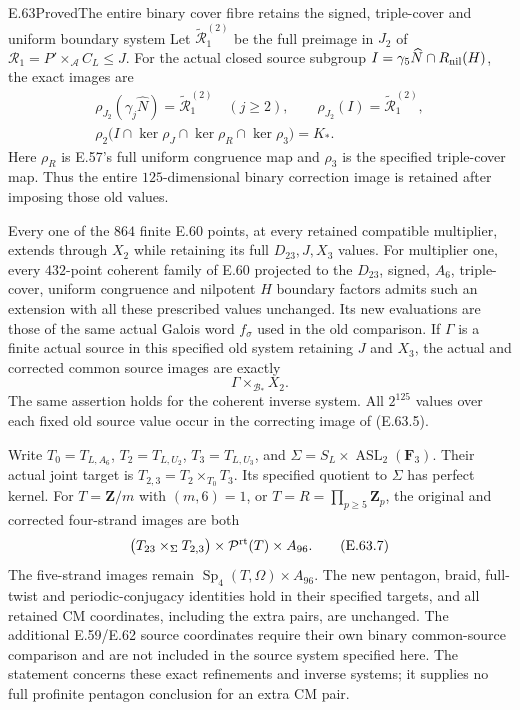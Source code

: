 \begin{statement}{E.63}{Proved}{The entire binary cover fibre retains the signed, triple-cover and uniform boundary system}
Let $\widetilde{\mathcal R}_1^{(2)}$ be the full preimage
in $J_2$ of $\mathcal R_1=P'\times_{\mathcal A}C_L\leq J$.
For the actual closed source subgroup
$I=\gamma_5\widehat N\cap R_{\rm nil}(H)$, the exact images are
\[
 \begin{gathered}
 \rho_{J_2}(\gamma_j\widehat N)
       =\widetilde{\mathcal R}_1^{(2)}\quad(j\geq2),
 \qquad \rho_{J_2}(I)=\widetilde{\mathcal R}_1^{(2)},\\
 \rho_2\bigl(I\cap\ker\rho_J\cap\ker\rho_R
                        \cap\ker\rho_3\bigr)=K_*.
 \end{gathered}
 \tag{E.63.5}
\]
Here $\rho_R$ is E.57's full uniform congruence map and
$\rho_3$ is the specified triple-cover map. Thus the
entire $125$-dimensional binary correction image is retained
after imposing those old values.

Every one of the $864$ finite E.60 points, at every retained
compatible multiplier, extends through $X_2$ while retaining
its full $D_{23},J,X_3$ values. For multiplier one, every
$432$-point coherent family of E.60 projected to the
$D_{23}$, signed, $A_6$, triple-cover, uniform congruence and
nilpotent $H$ boundary factors admits such an extension with
all these prescribed values unchanged. Its new evaluations
are those of the same actual Galois word $f_\sigma$ used in
the old comparison. If $\Gamma$ is a finite actual source
in this specified old system retaining $J$ and $X_3$, the
actual and corrected common source images are exactly
\[
                         \Gamma\times_{\mathcal B_*}X_2.
 \tag{E.63.6}
\]
The same assertion holds for the coherent inverse system.
All $2^{125}$ values over each fixed old source value occur
in the correcting image of \textup{(E.63.5)}.

Write $T_0=T_{L,A_6}$, $T_2=T_{L,U_2}$,
$T_3=T_{L,U_3}$, and
$\Sigma=S_L\times\operatorname{ASL}_2(\mathbf F_3)$.
Their actual joint target is
$T_{2,3}=T_2\times_{T_0}T_3$. Its specified quotient to
$\Sigma$ has perfect kernel. For $T=\mathbf Z/m$ with
$(m,6)=1$, or $T=R=\prod_{p\ge5}\mathbf Z_p$, the original
and corrected four-strand images are both
\[
 \bigl(T_{23}\times_{\Sigma}T_{2,3}\bigr)
             \times\mathcal P^{\rm rt}(T)\times A_{96}.
 \tag{E.63.7}
\]
The five-strand images remain
$\operatorname{Sp}_4(T,\Omega)\times A_{96}$.
The new pentagon, braid, full-twist and periodic-conjugacy
identities hold in their specified targets, and all retained
CM coordinates, including the extra pairs, are unchanged.
The additional E.59/E.62 source coordinates require their
own binary common-source comparison and are not included
in the source system specified here. The statement concerns
these exact refinements and inverse systems; it supplies no
full profinite pentagon conclusion for an extra CM pair.
\end{statement}

